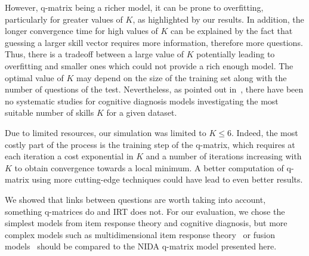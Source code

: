 \documentclass{sig-alternate}
\begin{document}
However, q-matrix being a richer model, it can be prone to overfitting, particularly for greater values of $K$, as highlighted by our results. In addition, the longer convergence time for high values of $K$ can be explained by the fact that guessing a larger skill vector requires more information, therefore more questions. Thus, there is a tradeoff between a large value of $K$ potentially leading to overfitting and smaller ones which could not provide a rich enough model. The optimal value of $K$ may depend on the size of the training set along with the number of questions of the test. Nevertheless, as pointed out in~\citep{Huebner2010}, there have been no systematic studies for cognitive diagnosis models investigating the most suitable number of skills $K$ for a given dataset.



Due to limited resources, our simulation was limited to $K \leqslant 6$. Indeed, the most costly part of the process is the training step of the q-matrix, which requires at each iteration a cost exponential in $K$ and a number of iterations increasing with $K$ to obtain convergence towards a local minimum. A better computation of q-matrix using more cutting-edge techniques could have lead to even better results.







We showed that links between questions are worth taking into account, something q-matrices do and IRT does not. For our evaluation, we chose the simplest models from item response theory and cognitive diagnosis, but more complex models such as multidimensional item response theory~\citep{Desmarais2012} or fusion models~\citep{McGlohen2008} should be compared to the NIDA q-matrix model presented here.
\end{document}
